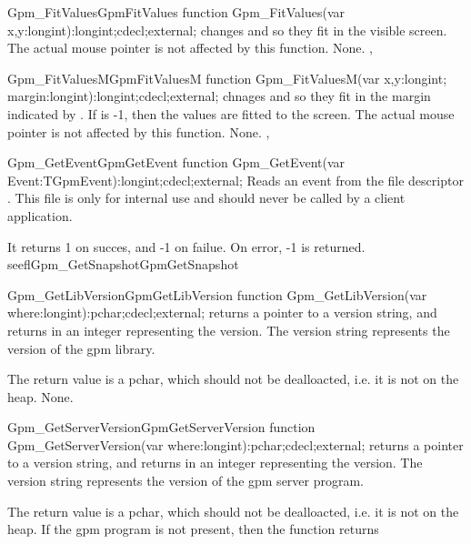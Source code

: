 \begin{functionl}{Gpm\_FitValues}{GpmFitValues}
\Declaration
function Gpm\_FitValues(var x,y:longint):longint;cdecl;external;
\Description
{} changes  and  so they fit in the visible
screen. The actual mouse pointer is not affected by this function.
\Errors
None.
\SeeAlso
{},
\end{functionl}

\begin{functionl}{Gpm\_FitValuesM}{GpmFitValuesM}
\Declaration
function Gpm\_FitValuesM(var x,y:longint; margin:longint):longint;cdecl;external;
\Description
{} chnages  and  so they fit in the margin
indicated by . If  is -1, then the values are fitted
to the screen. The actual mouse pointer is not affected by this function.
\Errors
None.
\SeeAlso
{},
\end{functionl}

\begin{functionl}{Gpm\_GetEvent}{GpmGetEvent}
\Declaration
function Gpm\_GetEvent(var Event:TGpmEvent):longint;cdecl;external;
\Description
{} Reads an event from the file descriptor .
This file is only for internal use and should never be called by a client
application. 

It returns 1 on succes, and -1 on failue.
\Errors
On error, -1 is returned. 
\SeeAlso
seefl{Gpm\_GetSnapshot}{GpmGetSnapshot}
\end{functionl}

\begin{functionl}{Gpm\_GetLibVersion}{GpmGetLibVersion}
\Declaration
function Gpm\_GetLibVersion(var where:longint):pchar;cdecl;external;
\Description
{} returns a pointer to a version string, and returns
in  an integer representing the version. The version string
represents the version of the gpm library.

The return value is a pchar, which should not be dealloacted, i.e. it is not
on the heap.
\Errors
None.
\SeeAlso
{}
\end{functionl}

\begin{functionl}{Gpm\_GetServerVersion}{GpmGetServerVersion}
\Declaration
function Gpm\_GetServerVersion(var where:longint):pchar;cdecl;external;
\Description
{} returns a pointer to a version string, and 
returns in  an integer representing the version. The version string
represents the version of the gpm server program.

The return value is a pchar, which should not be dealloacted, i.e. it is not
on the heap.
\Errors
If the gpm program is not present, then the function returns 
\SeeAlso
{}
\end{functionl}

